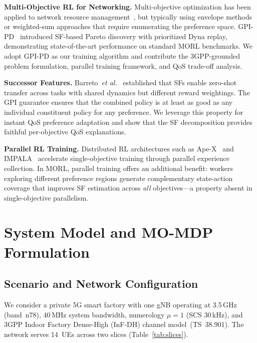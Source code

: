 \documentclass[conference]{IEEEtran}
\newcommand{\etal}{\textit{et al.}}
\begin{document}
\textbf{Multi-Objective RL for Networking.}
Multi-objective optimization has been applied to network resource management~\cite{morl_net1}, but typically using envelope methods or weighted-sum approaches that require enumerating the preference space.
GPI-PD~\cite{gpipd} introduced SF-based Pareto discovery with prioritized Dyna replay, demonstrating state-of-the-art performance on standard MORL benchmarks.
We adopt GPI-PD as our training algorithm and contribute the 3GPP-grounded problem formulation, parallel training framework, and QoS trade-off analysis.

\textbf{Successor Features.}
Barreto~\etal~\cite{barreto2017,barreto2018} established that SFs enable zero-shot transfer across tasks with shared dynamics but different reward weightings.
The GPI guarantee ensures that the combined policy is at least as good as any individual constituent policy for any preference.
We leverage this property for instant QoS preference adaptation and show that the SF decomposition provides faithful per-objective QoS explanations.

\textbf{Parallel RL Training.}
Distributed RL architectures such as Ape-X~\cite{apex} and IMPALA~\cite{impala} accelerate single-objective training through parallel experience collection.
In MORL, parallel training offers an additional benefit: workers exploring different preference regions generate complementary state-action coverage that improves SF estimation across \emph{all} objectives---a property absent in single-objective parallelism.

\section{System Model and MO-MDP Formulation}\label{sec:model}

\subsection{Scenario and Network Configuration}\label{sec:scenario}

We consider a private 5G smart factory with one gNB operating at 3.5\,GHz (band~n78), 40\,MHz system bandwidth, numerology $\mu{=}1$ (SCS 30\,kHz), and 3GPP Indoor Factory Dense-High (InF-DH) channel model~(TS~38.901).
The network serves 14~UEs across two slices (Table~\ref{tab:slices}).
\end{document}
